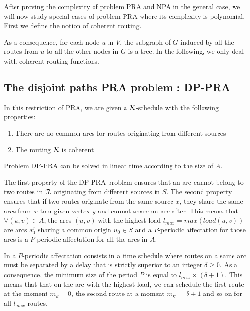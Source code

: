 \documentclass{article}
\newcommand\rschedule{$\cal R$-schedule\xspace}
\begin{document}
After proving the complexity of problem PRA and NPA in the general case, we will now study special cases of problem PRA where its complexity is polynomial. First we define the notion of coherent routing.
% 

As a consequence, for each node $u$ in $V$, the subgraph of $G$ induced by all the routes from $u$ to all the other nodes in $G$ is a tree. In the following, we only deal with coherent routing functions.

\subsection{The disjoint paths PRA problem : DP-PRA}
In this restriction of PRA, we are given a \rschedule with the following properties:
\begin{enumerate}
\item There are no common arcs for routes originating from different sources
\item The routing $\cal R$ is coherent 
\end{enumerate}

\begin{proposition}
\label{DP-PRA}
Problem DP-PRA can be solved in linear time according to the size of $A$.
\end{proposition}

The first property of the DP-PRA problem ensures that an arc cannot belong to two routes in $\cal R$ originating from different sources in $S$. The second property ensures that if two routes originate from the same source $x$, they share the same arcs from $x$ to a given vertex $y$ and cannot share an arc after. This means that $\forall (u,v) \in A$, the arcs $(u,v)$ with the highest load $l_{max} = max(load(u,v))$ are arcs $a_0^j$ sharing a common origin $u_0 \in S$ and a $P$-periodic affectation for those arcs is a $P$-periodic affectation for all the arcs in $A$.

In a $P$-periodic affectation consists in a time schedule where routes on a same arc must be separated by a delay that is strictly superior to an integer $\delta \geq 0$. As a consequence, the minimum size of the period $P$ is equal to $l_{max} \times (\delta + 1)$. This means that that on the arc with the highest load, we can schedule the first route at the moment $m_k = 0$, the second route at a moment $m_{k'} = \delta + 1$ and so on for all $l_{max}$ routes. 
\end{document}
